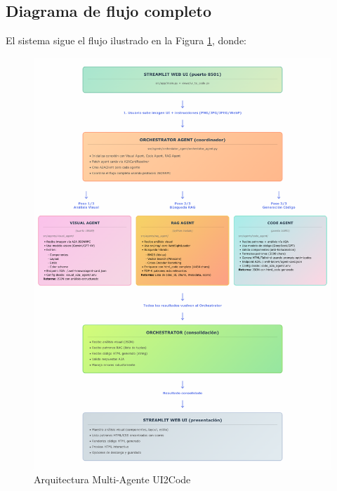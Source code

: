 \documentclass[12pt,a4paper]{article}
\begin{document}
\subsection{Diagrama de flujo completo}

El sistema sigue el flujo ilustrado en la Figura \ref{fig:arquitectura}, donde:

\begin{figure}[H]
\centering
\includegraphics[width=\textwidth]{../docs/diagrama-flujo-arquitectura-multi-agente.png}
\caption{Arquitectura Multi-Agente UI2Code}
\label{fig:arquitectura}
\end{figure}
\end{document}
